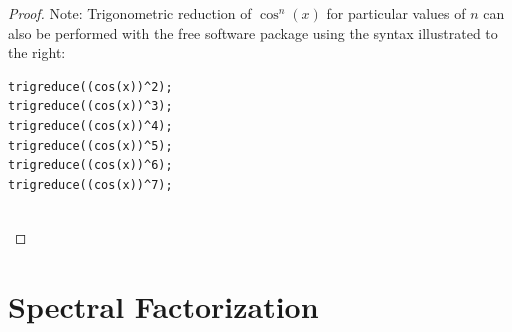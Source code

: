 \begin{proof}
\begin{minipage}{\tw-67mm}%
  Note: Trigonometric reduction of $\cos^n(x)$ for particular values of $n$ 
  can also be performed with the free software package 
      \href{http://maxima.sourceforge.net/}{\texttrademark} using the syntax illustrated to the right:\footnotemark
\end{minipage}%
\hspace{10mm}%
\begin{minipage}{50mm}
\begin{lstlisting}
trigreduce((cos(x))^2);
trigreduce((cos(x))^3);
trigreduce((cos(x))^4);
trigreduce((cos(x))^5);
trigreduce((cos(x))^6);
trigreduce((cos(x))^7);
\end{lstlisting}
\end{minipage}%
\mbox{}\\
\end{proof}



\section{Spectral Factorization}


